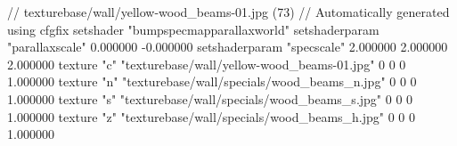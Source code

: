 // texturebase/wall/yellow-wood_beams-01.jpg (73)
// Automatically generated using cfgfix
setshader "bumpspecmapparallaxworld"
setshaderparam "parallaxscale" 0.000000 -0.000000
setshaderparam "specscale" 2.000000 2.000000 2.000000
texture "c" "texturebase/wall/yellow-wood_beams-01.jpg" 0 0 0 1.000000
texture "n" "texturebase/wall/specials/wood_beams_n.jpg" 0 0 0 1.000000
texture "s" "texturebase/wall/specials/wood_beams_s.jpg" 0 0 0 1.000000
texture "z" "texturebase/wall/specials/wood_beams_h.jpg" 0 0 0 1.000000

